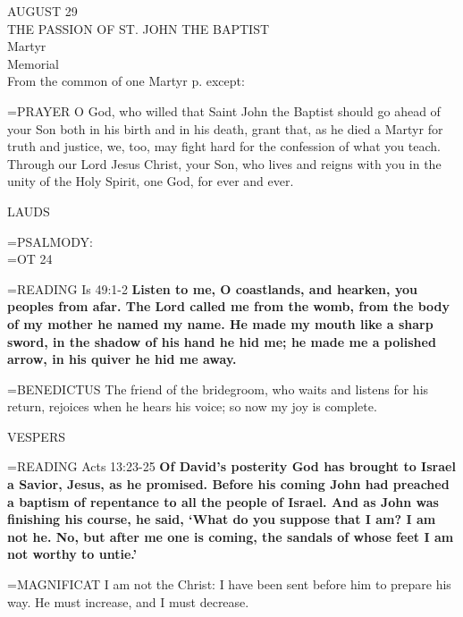 \begin{center}\normalsize AUGUST 29\\
\footnotesize THE PASSION OF ST. JOHN THE BAPTIST\\
\footnotesize Martyr \\
\footnotesize Memorial\\
\footnotesize From the common of one Martyr p.   except:\\
\end{center}

\hangindent=\parindent \small{PRAYER 
O God, who willed that Saint John the Baptist
should go ahead of your Son
both in his birth and in his death,
grant that, as he died a Martyr for truth and justice,
we, too, may fight hard
for the confession of what you teach.
Through our Lord Jesus Christ, your Son,
who lives and reigns with you in the unity of the Holy Spirit,
one God, for ever and ever.\\}
 
\begin{flushleft}\normalsize LAUDS\\\end{flushleft}

\hangindent=\parindent \small{PSALMODY:}\\
\hangindent=\parindent  OT 24\vspace{0.5em}

\hangindent=\parindent \small{READING} Is 49:1-2 \textbf{Listen to me, O coastlands, and hearken, you
peoples from afar. The Lord called me from the womb, from the
body of my mother he named my name. He made my mouth like
a sharp sword, in the shadow of his hand he hid me; he made me a
polished arrow, in his quiver he hid me away.\\}
 
\hangindent=\parindent \small{BENEDICTUS  The friend of the bridegroom, who waits and listens
for his return, rejoices when he hears his voice; so now my joy is
complete.\\}
 
\begin{flushleft}\normalsize VESPERS\\\end{flushleft}

\hangindent=\parindent \small{READING} Acts 13:23-25 \textbf{Of David’s posterity God has brought to Israel a
Savior, Jesus, as he promised. Before his coming John had preached
a baptism of repentance to all the people of Israel. And as John was
finishing his course, he said, ‘What do you suppose that I am? I am
not he. No, but after me one is coming, the sandals of whose feet I
am not worthy to untie.’\\}
 
\hangindent=\parindent \small{MAGNIFICAT  I am not the Christ: I have been sent before him to prepare
his way. He must increase, and I must decrease.\\}
 
